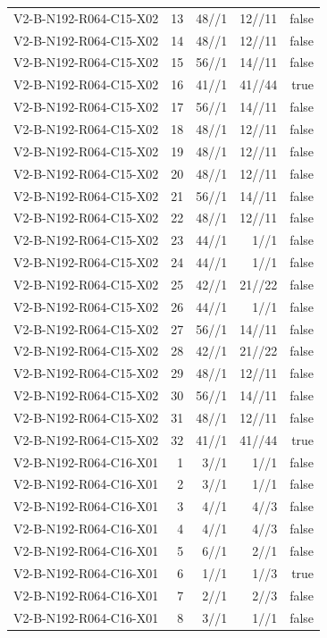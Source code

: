 {\begin{longtable}{lrrrr}
V2-B-N192-R064-C15-X02 & 13 & 48//1 & 12//11 & false \\
V2-B-N192-R064-C15-X02 & 14 & 48//1 & 12//11 & false \\
V2-B-N192-R064-C15-X02 & 15 & 56//1 & 14//11 & false \\
V2-B-N192-R064-C15-X02 & 16 & 41//1 & 41//44 & true \\
V2-B-N192-R064-C15-X02 & 17 & 56//1 & 14//11 & false \\
V2-B-N192-R064-C15-X02 & 18 & 48//1 & 12//11 & false \\
V2-B-N192-R064-C15-X02 & 19 & 48//1 & 12//11 & false \\
V2-B-N192-R064-C15-X02 & 20 & 48//1 & 12//11 & false \\
V2-B-N192-R064-C15-X02 & 21 & 56//1 & 14//11 & false \\
V2-B-N192-R064-C15-X02 & 22 & 48//1 & 12//11 & false \\
V2-B-N192-R064-C15-X02 & 23 & 44//1 & 1//1 & false \\
V2-B-N192-R064-C15-X02 & 24 & 44//1 & 1//1 & false \\
V2-B-N192-R064-C15-X02 & 25 & 42//1 & 21//22 & false \\
V2-B-N192-R064-C15-X02 & 26 & 44//1 & 1//1 & false \\
V2-B-N192-R064-C15-X02 & 27 & 56//1 & 14//11 & false \\
V2-B-N192-R064-C15-X02 & 28 & 42//1 & 21//22 & false \\
V2-B-N192-R064-C15-X02 & 29 & 48//1 & 12//11 & false \\
V2-B-N192-R064-C15-X02 & 30 & 56//1 & 14//11 & false \\
V2-B-N192-R064-C15-X02 & 31 & 48//1 & 12//11 & false \\
V2-B-N192-R064-C15-X02 & 32 & 41//1 & 41//44 & true \\
V2-B-N192-R064-C16-X01 & 1 & 3//1 & 1//1 & false \\
V2-B-N192-R064-C16-X01 & 2 & 3//1 & 1//1 & false \\
V2-B-N192-R064-C16-X01 & 3 & 4//1 & 4//3 & false \\
V2-B-N192-R064-C16-X01 & 4 & 4//1 & 4//3 & false \\
V2-B-N192-R064-C16-X01 & 5 & 6//1 & 2//1 & false \\
V2-B-N192-R064-C16-X01 & 6 & 1//1 & 1//3 & true \\
V2-B-N192-R064-C16-X01 & 7 & 2//1 & 2//3 & false \\
V2-B-N192-R064-C16-X01 & 8 & 3//1 & 1//1 & false \\

\end{longtable}}
